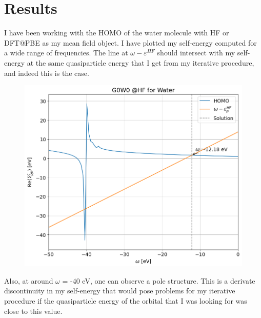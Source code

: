 \documentclass[12pt]{article}
\begin{document}
\section{Results}
I have been working with the HOMO of the water molecule with HF or DFT@PBE as my mean field object. I have plotted my self-energy computed for a wide range of frequencies. The line at $\omega - \varepsilon^{HF}$ should intersect with my self-energy at the same quasiparticle energy that I get from my iterative procedure, and indeed this is the case.
\begin{figure}[h]
    \centering
    \includegraphics[width=\textwidth]{correlation_energies.png}
\end{figure}
Also, at around $\omega$ = -40 eV, one can observe a pole structure. This is a derivate discontinuity in my self-energy that would pose problems for my iterative procedure if the quasiparticle energy of the orbital that I was looking for was close to this value.
\end{document}
